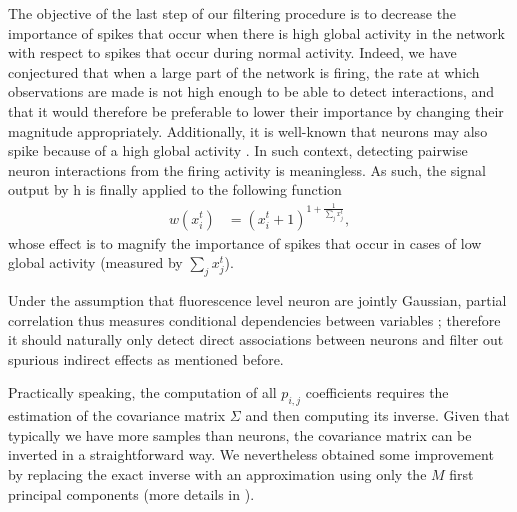 \documentclass[wcp]{jmlr}
\begin{document}
The objective of the last step of our filtering procedure is to decrease the
importance of spikes that occur when there is high global activity in the
network with respect to spikes that occur during normal activity. Indeed, we
have conjectured that when a large part of the network is firing, the rate at
which observations are made is not high enough to be able to detect
interactions, and that it would therefore be preferable to lower their
importance by changing their magnitude appropriately. Additionally, it is well-known
that neurons may also spike because of a high global activity
\citep{stetter2012model}. In such context, detecting pairwise neuron
interactions from the firing activity is meaningless. As such, the signal
output by h is finally applied to the following function
\begin{align}
 w(x^{t}_i) &= (x^{t}_i + 1 )^{1 + \frac{1}{\sum_{j} x^{t}_j}}, \label{eq:magnify-filter}
\end{align}
whose effect is to magnify the importance of spikes that occur in cases of low
global activity (measured by $\sum_j x^t_j$).

Under the assumption that fluorescence level neuron are jointly Gaussian,
partial correlation thus measures conditional dependencies between
variables ; therefore it should naturally only detect direct associations
between neurons and filter out spurious indirect effects as mentioned before.

Practically speaking, the computation of all $p_{i,j}$ coefficients requires
the estimation of the covariance matrix $\Sigma$ and then computing its
inverse. Given that typically we have more samples than neurons, the covariance
matrix can be inverted in a straightforward way. We nevertheless obtained some
improvement by replacing the exact inverse with an approximation using only the
$M$ first principal components \citep{bishop2006pattern} (more details in
\citep{sutera2014simple}).
\end{document}
